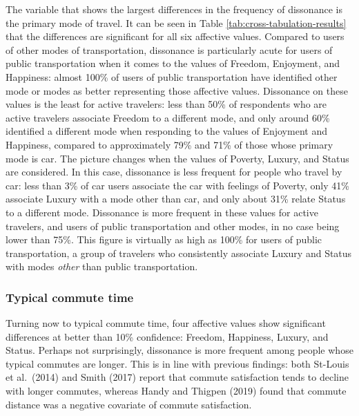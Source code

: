 \documentclass[]{elsarticle} %
\begin{document}
The variable that shows the largest differences in the frequency of
dissonance is the primary mode of travel. It can be seen in Table
\ref{tab:cross-tabulation-results} that the differences are significant
for all six affective values. Compared to users of other modes of
transportation, dissonance is particularly acute for users of public
transportation when it comes to the values of Freedom, Enjoyment, and
Happiness: almost 100\% of users of public transportation have
identified other mode or modes as better representing those affective
values. Dissonance on these values is the least for active travelers:
less than 50\% of respondents who are active travelers associate Freedom
to a different mode, and only around 60\% identified a different mode
when responding to the values of Enjoyment and Happiness, compared to
approximately 79\% and 71\% of those whose primary mode is car. The
picture changes when the values of Poverty, Luxury, and Status are
considered. In this case, dissonance is less frequent for people who
travel by car: less than 3\% of car users associate the car with
feelings of Poverty, only 41\% associate Luxury with a mode other than
car, and only about 31\% relate Status to a different mode. Dissonance
is more frequent in these values for active travelers, and users of
public transportation and other modes, in no case being lower than 75\%.
This figure is virtually as high as 100\% for users of public
transportation, a group of travelers who consistently associate Luxury
and Status with modes \emph{other} than public transportation.

\hypertarget{typical-commute-time}{%
\subsubsection{Typical commute time}\label{typical-commute-time}}

Turning now to typical commute time, four affective values show
significant differences at better than 10\% confidence: Freedom,
Happiness, Luxury, and Status. Perhaps not surprisingly, dissonance is
more frequent among people whose typical commutes are longer. This is in
line with previous findings: both St-Louis et al.~(2014) and Smith
(2017) report that commute satisfaction tends to decline with longer
commutes, whereas Handy and Thigpen (2019) found that commute distance
was a negative covariate of commute satisfaction.
\end{document}
